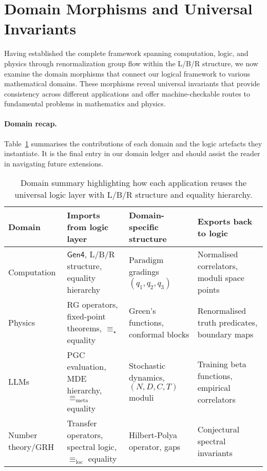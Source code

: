 \section{Domain Morphisms and Universal Invariants}
\label{sec:unified-theory}

Having established the complete framework spanning computation, logic, and physics through renormalization group flow within the L/B/R structure, we now examine the domain morphisms that connect our logical framework to various mathematical domains. These morphisms reveal universal invariants that provide consistency across different applications and offer machine-checkable routes to fundamental problems in mathematics and physics.

\paragraph{Domain recap.} Table~\ref{tab:domain-summary} summarises the contributions of each domain and the logic artefacts they instantiate. It is the final entry in our domain ledger and should assist the reader in navigating future extensions.

\begin{table}[h]
  \centering
  \begin{tabular}{@{}llll@{}}
    \toprule
    Domain & Imports from logic layer & Domain-specific structure & Exports back to logic \\
    \midrule
    Computation & $\mathsf{Gen4}$, L/B/R structure, equality hierarchy & Paradigm gradings $(q_1,q_2,q_3)$ & Normalised correlators, moduli space points \\
    Physics & RG operators, fixed-point theorems, $\equiv_\star$ equality & Green's functions, conformal blocks & Renormalised truth predicates, boundary maps \\
    LLMs & PGC evaluation, MDE hierarchy, $\equiv_{\text{meta}}$ equality & Stochastic dynamics, $(N,D,C,T)$ moduli & Training beta functions, empirical correlators \\
    Number theory/GRH & Transfer operators, spectral logic, $\equiv_{\text{loc}}$ equality & Hilbert-Polya operator, gaps & Conjectural spectral invariants \\
    \bottomrule
  \end{tabular}
  \caption{Domain summary highlighting how each application reuses the universal logic layer with L/B/R structure and equality hierarchy.}
  \label{tab:domain-summary}
\end{table}

